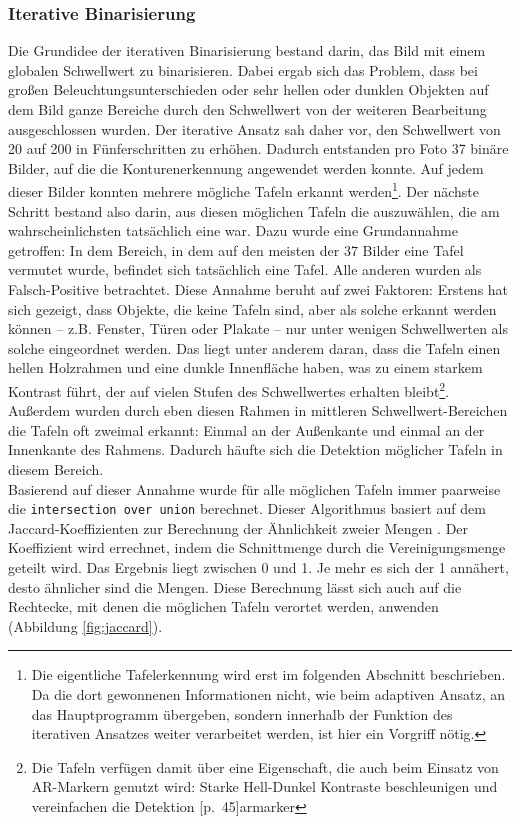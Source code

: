 \subsubsection*{Iterative Binarisierung}

Die Grundidee der iterativen Binarisierung bestand darin, das Bild mit einem globalen Schwellwert zu binarisieren. Dabei ergab sich das Problem, dass bei großen Beleuchtungsunterschieden oder sehr hellen oder dunklen Objekten auf dem Bild ganze Bereiche durch den Schwellwert von der weiteren Bearbeitung ausgeschlossen wurden. Der iterative Ansatz sah daher vor, den Schwellwert von 20 auf 200 in Fünferschritten zu erhöhen. Dadurch entstanden pro Foto 37 binäre Bilder, auf die die Konturenerkennung angewendet werden konnte. Auf jedem dieser Bilder konnten mehrere mögliche Tafeln erkannt werden\footnote{Die eigentliche Tafelerkennung wird erst im folgenden Abschnitt beschrieben. Da die dort gewonnenen Informationen nicht, wie beim adaptiven Ansatz, an das Hauptprogramm übergeben, sondern innerhalb der Funktion des iterativen Ansatzes weiter verarbeitet werden, ist hier ein Vorgriff nötig.}. Der nächste Schritt bestand also darin, aus diesen möglichen Tafeln die auszuwählen, die am wahrscheinlichsten tatsächlich eine war. Dazu wurde eine Grundannahme getroffen: In dem Bereich, in dem auf den meisten der 37 Bilder eine Tafel vermutet wurde, befindet sich tatsächlich eine Tafel. Alle anderen wurden als Falsch-Positive betrachtet. Diese Annahme beruht auf zwei Faktoren: Erstens hat sich gezeigt, dass Objekte, die keine Tafeln sind, aber als solche erkannt werden können -- z.B. Fenster, Türen oder Plakate -- nur unter wenigen Schwellwerten als solche eingeordnet werden. Das liegt unter anderem daran, dass die Tafeln einen hellen Holzrahmen und eine dunkle Innenfläche haben, was zu einem starkem Kontrast führt, der auf vielen Stufen des Schwellwertes erhalten bleibt\footnote{Die Tafeln verfügen damit über eine Eigenschaft, die auch beim Einsatz von AR-Markern genutzt wird: Starke Hell-Dunkel Kontraste beschleunigen und vereinfachen die Detektion [p.~45]{armarker}}. Außerdem wurden durch eben diesen Rahmen in mittleren Schwellwert-Bereichen die Tafeln oft zweimal erkannt: Einmal an der Außenkante und einmal an der Innenkante des Rahmens. Dadurch häufte sich die Detektion möglicher Tafeln in diesem Bereich.\\
Basierend auf dieser Annahme wurde für alle möglichen Tafeln immer paarweise die \verb|intersection over union| berechnet. Dieser Algorithmus basiert auf dem Jaccard-Koeffizienten zur Berechnung der Ähnlichkeit zweier Mengen \cite{intersectionoverunion}. Der Koeffizient wird errechnet, indem die Schnittmenge durch die Vereinigungsmenge geteilt wird. Das Ergebnis liegt zwischen 0 und 1. Je mehr es sich der 1 annähert, desto ähnlicher sind die Mengen. Diese Berechnung lässt sich auch auf die Rechtecke, mit denen die möglichen Tafeln verortet werden, anwenden (Abbildung \ref{fig:jaccard}).

